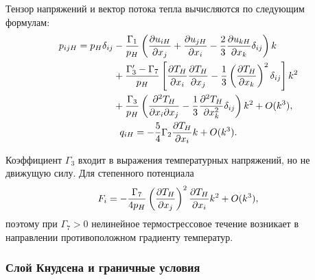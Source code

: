 Тензор напряжений и вектор потока тепла вычисляются по следующим формулам:
\begin{gather}
    \begin{aligned}
    p_{ijH} = p_H\delta_{ij} &- \frac{\Gamma_1}{p_H}\left(
            \pder[u_{iH}]{x_j} + \pder[u_{jH}]{x_i} - \frac23\pder[u_{kH}]{x_k}\delta_{ij} \right)k \\
        &+ \frac{\Gamma_3'-\Gamma_7}{p_H}\left[
            \pder[T_H]{x_i}\pder[T_H]{x_j} - \frac13\left(\pder[T_H]{x_k}\right)^2\delta_{ij} \right]k^2 \\
        &+ \frac{\Gamma_3}{p_H}\left(
            \pderder[T_H]{x_i}{x_j} - \frac13\pderdual[T_H]{x_k}\delta_{ij} \right)k^2 + \OO{k^3},
    \end{aligned} \label{eq:kgf:stress} \\
    q_{iH} = -\frac54\Gamma_2\pder[T_H]{x_i}k + \OO{k^3}. \label{eq:kgf:heat_flux}
\end{gather}

Коэффициент \(\Gamma_3\) входит в выражения температурных напряжений,
но не движущую силу. Для степенного потенциала
\begin{equation}\label{eq:kgf:gamma7_force_simple}
    F_i = -\frac{\Gamma_7}{4p_H} \left(\pder[T_H]{x_j}\right)^2 \pder[T_H]{x_i} k^2 + \OO{k^3},
\end{equation}
поэтому при \(\Gamma_7>0\) нелинейное термострессовое течение возникает в направлении
противоположном градиенту температур.

\subsubsection{Слой Кнудсена и граничные условия}

